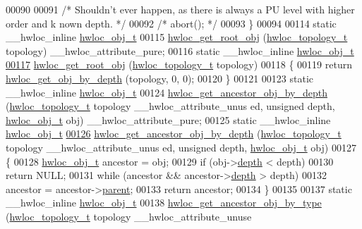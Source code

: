 \begin{DoxyCode}
00090 
00091   \textcolor{comment}{/* Shouldn't ever happen, as there is always a PU level with higher order and k
      nown depth.  */}
00092   \textcolor{comment}{/* abort(); */}
00093 \}
00094 
00114 \textcolor{keyword}{static} \_\_hwloc\_inline \hyperlink{a00016}{hwloc_obj_t}
00115 \hyperlink{a00053_gadbf58f6e187efbdb3cd9a8e30311b7d7}{hwloc_get_root_obj} (\hyperlink{a00039_ga9d1e76ee15a7dee158b786c30b6a6e38}{hwloc_topology_t} topology) \_\_hwloc\_attribute\_pure;
00116 \textcolor{keyword}{static} \_\_hwloc\_inline \hyperlink{a00016}{hwloc_obj_t}
\hypertarget{a00031_source_l00117}{}\hyperlink{a00053_gadbf58f6e187efbdb3cd9a8e30311b7d7}{00117} \hyperlink{a00053_gadbf58f6e187efbdb3cd9a8e30311b7d7}{hwloc_get_root_obj} (\hyperlink{a00039_ga9d1e76ee15a7dee158b786c30b6a6e38}{hwloc_topology_t} topology)
00118 \{
00119   \textcolor{keywordflow}{return} \hyperlink{a00047_gaedd78240b0c1108355586a268ec5a697}{hwloc_get_obj_by_depth} (topology, 0, 0);
00120 \}
00121 
00123 \textcolor{keyword}{static} \_\_hwloc\_inline \hyperlink{a00016}{hwloc_obj_t}
00124 \hyperlink{a00053_ga9b9d6af74eb0b78b1384aa66dd058ddc}{hwloc_get_ancestor_obj_by_depth} (\hyperlink{a00039_ga9d1e76ee15a7dee158b786c30b6a6e38}{hwloc_topology_t} topology \_\_hwloc\_attribute\_unus
      ed, \textcolor{keywordtype}{unsigned} depth, \hyperlink{a00016}{hwloc_obj_t} obj) \_\_hwloc\_attribute\_pure;
00125 \textcolor{keyword}{static} \_\_hwloc\_inline \hyperlink{a00016}{hwloc_obj_t}
\hypertarget{a00031_source_l00126}{}\hyperlink{a00053_ga9b9d6af74eb0b78b1384aa66dd058ddc}{00126} \hyperlink{a00053_ga9b9d6af74eb0b78b1384aa66dd058ddc}{hwloc_get_ancestor_obj_by_depth} (\hyperlink{a00039_ga9d1e76ee15a7dee158b786c30b6a6e38}{hwloc_topology_t} topology \_\_hwloc\_attribute\_unus
      ed, \textcolor{keywordtype}{unsigned} depth, \hyperlink{a00016}{hwloc_obj_t} obj)
00127 \{
00128   \hyperlink{a00016}{hwloc_obj_t} ancestor = obj;
00129   \textcolor{keywordflow}{if} (obj->\hyperlink{a00016_a9d82690370275d42d652eccdea5d3ee5}{depth} < depth)
00130     \textcolor{keywordflow}{return} NULL;
00131   \textcolor{keywordflow}{while} (ancestor && ancestor->\hyperlink{a00016_a9d82690370275d42d652eccdea5d3ee5}{depth} > depth)
00132     ancestor = ancestor->\hyperlink{a00016_adc494f6aed939992be1c55cca5822900}{parent};
00133   \textcolor{keywordflow}{return} ancestor;
00134 \}
00135 
00137 \textcolor{keyword}{static} \_\_hwloc\_inline \hyperlink{a00016}{hwloc_obj_t}
00138 \hyperlink{a00053_gac93e1a95a71add57ac841daef1b94e5e}{hwloc_get_ancestor_obj_by_type} (\hyperlink{a00039_ga9d1e76ee15a7dee158b786c30b6a6e38}{hwloc_topology_t} topology \_\_hwloc\_attribute\_unuse

\end{DoxyCode}
